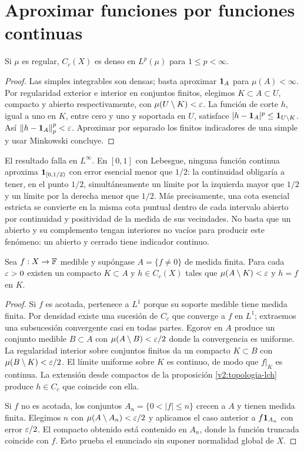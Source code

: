 \section{Aproximar funciones por funciones continuas}\label{lectura:v2-32}
\begin{teorema}\label{v2:cc-denso-lp}
Si $\mu$ es regular, $C_c(X)$ es denso en $L^p(\mu)$ para $1\le p<\infty$.
\end{teorema}
\begin{proof}
Las simples integrables son densas; basta aproximar $\mathbf1_{A}$ para $\mu(A)<\infty$. Por regularidad exterior e interior en conjuntos finitos, elegimos $K\subset A\subset U$, compacto y abierto respectivamente, con $\mu(U\setminus K)<\varepsilon$. La función de corte $h$, igual a uno en $K$, entre cero y uno y soportada en $U$, satisface $|h-\mathbf1_{A}|^p\le\mathbf1_{U\setminus K}$. Así $\left\lVert h-\mathbf1_{A}\right\rVert_p^p<\varepsilon$. Aproximar por separado los finitos indicadores de una simple y usar Minkowski concluye.
\end{proof}
El resultado falla en $L^\infty$. En $[0,1]$ con Lebesgue, ninguna función continua aproxima $\mathbf1_{[0,1/2)}$ con error esencial menor que $1/2$: la continuidad obligaría a tener, en el punto $1/2$, simultáneamente un límite por la izquierda mayor que $1/2$ y un límite por la derecha menor que $1/2$. Más precisamente, una cota esencial estricta se convierte en la misma cota puntual dentro de cada intervalo abierto por continuidad y positividad de la medida de sus vecindades. No basta que un abierto y su complemento tengan interiores no vacíos para producir este fenómeno: un abierto y cerrado tiene indicador continuo.
\begin{teorema}[Lusin]\label{v2:lusin}
Sea $f:X\to\mathbb F$ medible y supóngase $A=\{f\ne0\}$ de medida finita. Para cada $\varepsilon>0$ existen un compacto $K\subset A$ y $h\in C_c(X)$ tales que $\mu(A\setminus K)<\varepsilon$ y $h=f$ en $K$.
\end{teorema}
\begin{proof}
Si $f$ es acotada, pertenece a $L^1$ porque su soporte medible tiene medida finita. Por densidad existe una sucesión de $C_c$ que converge a $f$ en $L^1$; extraemos una subsucesión convergente casi en todas partes. Egorov en $A$ produce un conjunto medible $B\subset A$ con $\mu(A\setminus B)<\varepsilon/2$ donde la convergencia es uniforme. La regularidad interior sobre conjuntos finitos da un compacto $K\subset B$ con $\mu(B\setminus K)<\varepsilon/2$. El límite uniforme sobre $K$ es continuo, de modo que $f|_K$ es continua. La extensión desde compactos de la proposición \ref{v2:topologia-lch} produce $h\in C_c$ que coincide con ella.

Si $f$ no es acotada, los conjuntos $A_n=\{0<|f|\le n\}$ crecen a $A$ y tienen medida finita. Elegimos $n$ con $\mu(A\setminus A_n)<\varepsilon/2$ y aplicamos el caso anterior a $f\mathbf1_{A_n}$ con error $\varepsilon/2$. El compacto obtenido está contenido en $A_n$, donde la función truncada coincide con $f$. Esto prueba el enunciado sin suponer normalidad global de $X$.
\end{proof}

